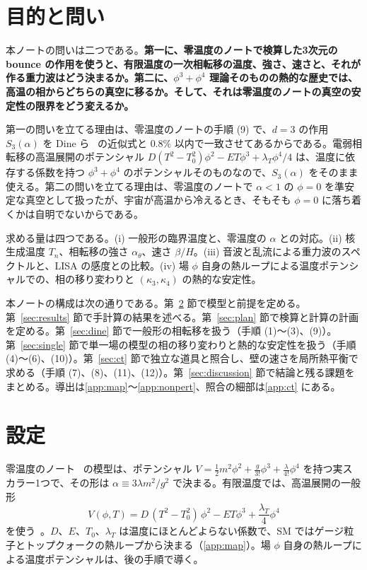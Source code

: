 \documentclass[a4paper,10pt]{ltjsarticle}
\begin{document}
\tableofcontents

\section{目的と問い}\label{sec:intro}

本ノートの問いは二つである。\textbf{第一に、零温度のノートで検算した3次元の bounce の作用を使うと、有限温度の一次相転移の温度、強さ、速さと、それが作る重力波はどう決まるか。第二に、$\phi^3+\phi^4$ 理論そのものの熱的な歴史では、高温の相からどちらの真空に移るか。そして、それは零温度のノートの真空の安定性の限界をどう変えるか。}

第一の問いを立てる理由は、零温度のノートの手順 (9) で、$d=3$ の作用 $S_3(\alpha)$ を Dine ら~\cite{dine92} の近似式と $0.8\%$ 以内で一致させてあるからである。電弱相転移の高温展開のポテンシャル $D(T^2-T_0^2)\phi^2-ET\phi^3+\lambda_T\phi^4/4$ は、温度に依存する係数を持つ $\phi^3+\phi^4$ のポテンシャルそのものなので、$S_3(\alpha)$ をそのまま使える。第二の問いを立てる理由は、零温度のノートで $\alpha<1$ の $\phi=0$ を準安定な真空として扱ったが、宇宙が高温から冷えるとき、そもそも $\phi=0$ に落ち着くかは自明でないからである。

求める量は四つである。(i) 一般形の臨界温度と、零温度の $\alpha$ との対応。(ii) 核生成温度 $T_n$、相転移の強さ $\alpha_\theta$、速さ $\beta/H$。(iii) 音波と乱流による重力波のスペクトルと、LISA の感度との比較。(iv) 場 $\phi$ 自身の熱ループによる温度ポテンシャルでの、相の移り変わりと $(\kappa_3,\kappa_4)$ の熱的な安定性。

本ノートの構成は次の通りである。第~\ref{sec:setup} 節で模型と前提を定める。第~\ref{sec:results} 節で手計算の結果を述べる。第~\ref{sec:plan} 節で検算と計算の計画を定める。第~\ref{sec:dine} 節で一般形の相転移を扱う（手順 (1)〜(3)、(9)）。第~\ref{sec:single} 節で単一場の模型の相の移り変わりと熱的な安定性を扱う（手順 (4)〜(6)、(10)）。第~\ref{sec:ct} 節で独立な道具と照合し、壁の速さを局所熱平衡で求める（手順 (7)、(8)、(11)、(12)）。第~\ref{sec:discussion} 節で結論と残る課題をまとめる。導出は\ref{app:map}〜\ref{app:nonpert}、照合の細部は\ref{app:ct} にある。

\section{設定}\label{sec:setup}

零温度のノート~\cite{phi34note} の模型は、ポテンシャル $V=\frac12m^2\phi^2+\frac g{3!}\phi^3+\frac\lambda{4!}\phi^4$ を持つ実スカラー1つで、その形は $\alpha\equiv3\lambda m^2/g^2$ で決まる。有限温度では、高温展開の一般形
\begin{equation}
V(\phi,T)=D\,(T^2-T_0^2)\,\phi^2-ET\phi^3+\frac{\lambda_T}{4}\phi^4
\label{eq:VT}
\end{equation}
を使う~\cite{dine92}。$D$、$E$、$T_0$、$\lambda_T$ は温度にほとんどよらない係数で、SM ではゲージ粒子とトップクォークの熱ループから決まる（\ref{app:map}）。場 $\phi$ 自身の熱ループによる温度ポテンシャルは、後の手順で導く。
\end{document}
